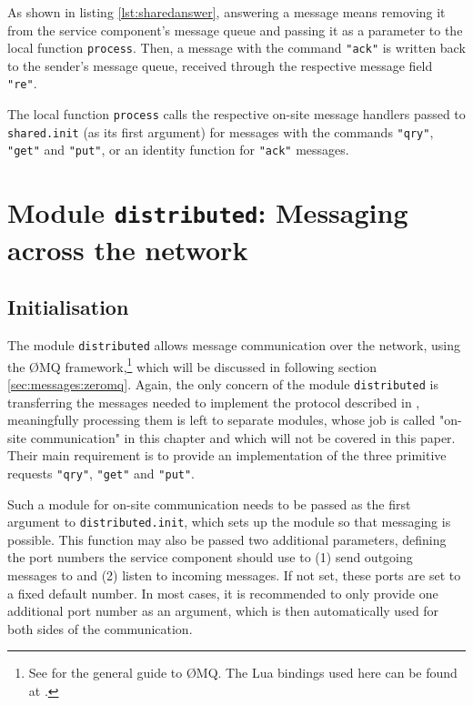 As shown in listing \ref{lst:sharedanswer}, answering a message means removing it from the service component's message queue and passing it as a parameter to the local function \texttt{process}. Then, a message with the command \texttt{"ack"} is written back to the sender's message queue, received through the respective message field \texttt{"re"}.

The local function \texttt{process} calls the respective on-site message handlers passed to \texttt{shared.init} (as its first argument) for messages with the commands \texttt{"qry"}, \texttt{"get"} and \texttt{"put"}, or an identity function for \texttt{"ack"} messages.


\section{Module \texttt{distributed}: Messaging across the network}
\label{sec:messaging:distributed}

\subsection{Initialisation}

The module \texttt{distributed} allows message communication over the network, using the \O MQ framework,\footnote{See \cite{ZeroMQ} for the general guide to \O MQ. The Lua bindings used here can be found at \cite{ZeroMQBindings}.} which will be discussed in following section \ref{sec:messages:zeromq}. Again, the only concern of the module \texttt{distributed} is transferring the messages needed to implement the protocol described in \cite{AscensD11}, meaningfully processing them is left to separate modules, whose job is called "on-site communication" in this chapter and which will not be covered in this paper. Their main requirement is to provide an implementation of the three primitive requests \texttt{"qry"}, \texttt{"get"} and \texttt{"put"}. 

Such a module for on-site communication needs to be passed as the first argument to \texttt{distributed.init}, which sets up the module so that messaging is possible. This function may also be passed two additional parameters, defining the port numbers the service component should use to (1) send outgoing messages to and (2) listen to incoming messages. If not set, these ports are set to a fixed default number. In most cases, it is recommended to only provide one additional port number as an argument, which is then automatically used for both sides of the communication.

